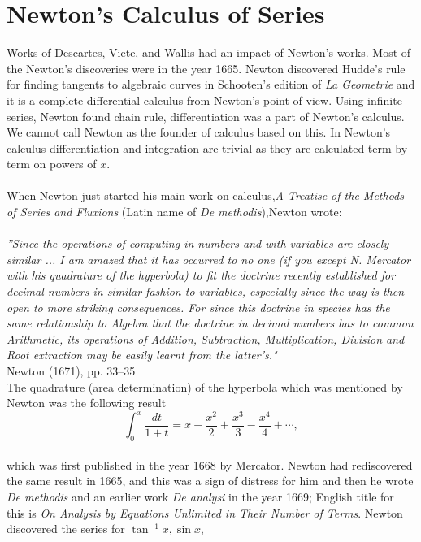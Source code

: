\documentclass[a4paper,reqno,11pt]{amsart}
\theoremstyle{plain}%
\begin{document}
\section{Newton’s Calculus of Series}
Works of Descartes, Viete, and Wallis had an impact of Newton's works. Most of the Newton's discoveries were in the year 1665. Newton discovered Hudde's rule for finding tangents to algebraic curves in Schooten’s edition
of \textit{La Geometrie} and it is a complete differential calculus from Newton’s point of view. Using infinite series, Newton found chain rule, differentiation was a part of Newton's calculus. We cannot call Newton as the founder of calculus based on this. In Newton's calculus differentiation and integration are trivial as they are calculated term by term on powers of $x$.\\
\\
\indent When Newton just started his main work on calculus,\textit{A Treatise of the Methods of Series and Fluxions} (Latin name of \textit{De methodis}),Newton wrote:\\
\\
\textit{''Since the operations of computing in numbers and with variables are closely similar ... I am amazed that it has occurred
to no one (if you except N. Mercator with his quadrature of
the hyperbola) to fit the doctrine recently established for decimal numbers in similar fashion to variables, especially since
the way is then open to more striking consequences. For since
this doctrine in species has the same relationship to Algebra
that the doctrine in decimal numbers has to common Arithmetic, its operations of Addition, Subtraction, Multiplication,
Division and Root extraction may be easily learnt from the
latter’s."}\cite{ref 5}\\
\vspace{2ex}
\hfill{Newton (1671), pp. 33–35}\\
The quadrature (area determination) of the hyperbola which was mentioned by
Newton was the following result\\
$$\int_{0}^{x} \frac{dt}{1+t} = x - \frac{x^2}{2} + \frac{x^3}{3} - \frac{x^4}{4} + \cdots,$$
\\
which was first published in the year 1668 by Mercator. Newton had rediscovered the same result
in 1665, and this was a sign of distress for him and then he wrote \textit{De methodis} and an earlier work \textit{De analysi} in the year 1669; English title for this is \textit{On Analysis by Equations Unlimited in Their Number of
Terms}. Newton discovered the series for $\tan^{-1}x, \sin x,$
\end{document}
